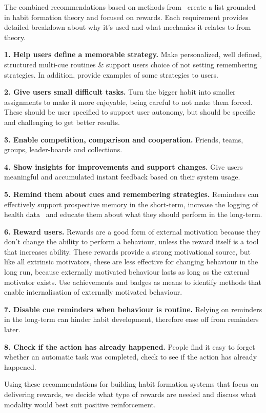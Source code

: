 The combined recommendations based on methods from~\cite{thesis_kathy, article_taxonomy_motivational_affordances_meaningful} create a list grounded in habit formation theory and focused on rewards. Each requirement provides detailed breakdown about why it's used and what mechanics it relates to from theory.

\textbf{1. Help users define a memorable strategy.}\newline
Make personalized, well defined, structured multi-cue routines \& support users choice of not setting remembering strategies. In addition, provide examples of some strategies to users.

\textbf{2. Give users small difficult tasks.}\newline
Turn the bigger habit into smaller assignments to make it more enjoyable, being careful to not make them forced. These should be user specified to support user autonomy, but should be specific and challenging to get better results.

\textbf{3. Enable competition, comparison and cooperation.}\newline
Friends, teams, groups, leader-boards and collections.

\textbf{4. Show insights for improvements and support changes.}\newline
Give users meaningful and accumulated instant feedback based on their system usage.

\textbf{5. Remind them about cues and remembering strategies.}\newline
Reminders can effectively support prospective memory in the short-term, increase the logging of health data~\cite{the_power_of_logging_mobile_notifications} and educate them about what they should perform in the long-term.

\textbf{6. Reward users.}\newline
Rewards are a good form of external motivation because they don't change the ability to perform a behaviour, unless the reward itself is a tool that increases ability. These rewards provide a strong motivational source, but like all extrinsic motivators, these are less effective for changing behaviour in the long run, because externally motivated behaviour lasts as long as the external motivator exists. Use achievements and badges as means to identify methods that enable internalisation of externally motivated behaviour.

\textbf{7. Disable cue reminders when behaviour is routine.}\newline
Relying on reminders in the long-term can hinder habit development, therefore ease off from reminders later.

\textbf{8. Check if the action has already happened.}\newline
People find it easy to forget whether an automatic task was completed, check to see if the action has already happened.



Using these recommendations for building habit formation systems that focus on delivering rewards, we decide what type of rewards are needed and discuss what modality would best suit positive reinforcement.
